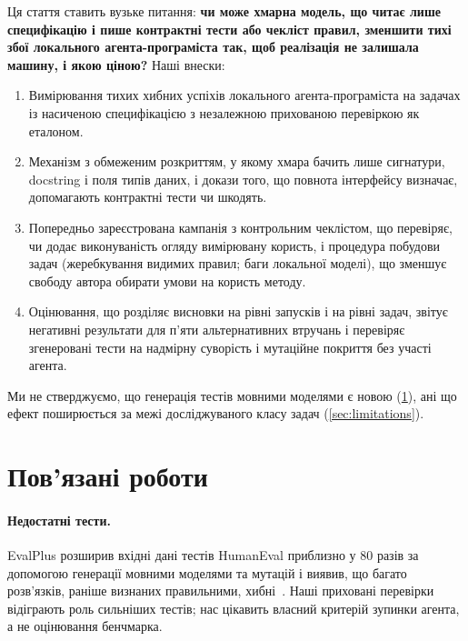 \documentclass[11pt]{article}
\begin{document}
Ця стаття ставить вузьке питання: \textbf{чи може хмарна модель, що читає лише специфікацію і пише контрактні тести або чекліст правил, зменшити тихі збої локального агента-програміста так, щоб реалізація не залишала машину, і якою ціною?} Наші внески:
\begin{enumerate}
\item Вимірювання тихих хибних успіхів локального агента-програміста на задачах із насиченою специфікацією з незалежною прихованою перевіркою як еталоном.
\item Механізм з обмеженим розкриттям, у якому хмара бачить лише сигнатури, docstring і поля типів даних, і докази того, що повнота інтерфейсу визначає, допомагають контрактні тести чи шкодять.
\item Попередньо зареєстрована кампанія з контрольним чеклістом, що перевіряє, чи додає виконуваність огляду вимірювану користь, і процедура побудови задач (жеребкування видимих правил; баги локальної моделі), що зменшує свободу автора обирати умови на користь методу.
\item Оцінювання, що розділяє висновки на рівні запусків і на рівні задач, звітує негативні результати для п'яти альтернативних втручань і перевіряє згенеровані тести на надмірну суворість і мутаційне покриття без участі агента.
\end{enumerate}
Ми не стверджуємо, що генерація тестів мовними моделями є новою (\cref{sec:related}), ані що ефект поширюється за межі досліджуваного класу задач (\cref{sec:limitations}).

\section{Пов'язані роботи}\label{sec:related}
\paragraph{Недостатні тести.} EvalPlus розширив вхідні дані тестів HumanEval приблизно у 80 разів за допомогою генерації мовними моделями та мутацій і виявив, що багато розв'язків, раніше визнаних правильними, хибні~\citep{liu2023evalplus}. Наші приховані перевірки відіграють роль сильніших тестів; нас цікавить власний критерій зупинки агента, а не оцінювання бенчмарка.
\end{document}
